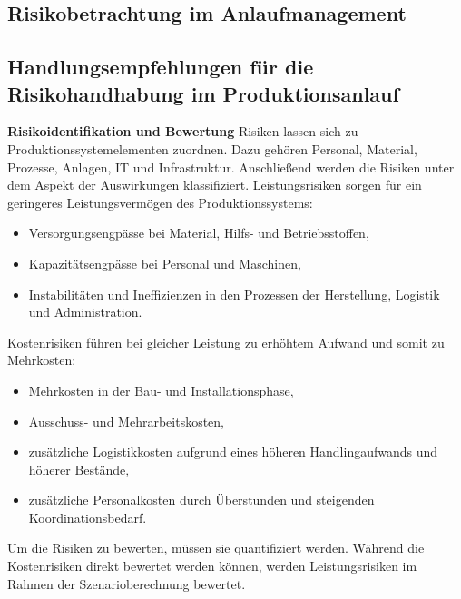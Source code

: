 \subsection{Risikobetrachtung im Anlaufmanagement}

\subsection{Handlungsempfehlungen für die Risikohandhabung im Produktionsanlauf}

\textbf{Risikoidentifikation und Bewertung}
Risiken lassen sich zu Produktionssystemelementen zuordnen. Dazu gehören Personal, Material, Prozesse, Anlagen, IT und Infrastruktur. Anschließend werden die Risiken unter dem Aspekt der Auswirkungen klassifiziert. Leistungsrisiken sorgen für ein geringeres Leistungsvermögen des Produktionssystems:
\begin{itemize}
 \item Versorgungsengpässe bei Material,
Hilfs- und Betriebsstoffen,
\item Kapazitätsengpässe bei Personal und
Maschinen,
\item Instabilitäten und Ineffizienzen in
den Prozessen der Herstellung,
Logistik und Administration.
\end{itemize}
Kostenrisiken führen bei gleicher Leistung zu erhöhtem Aufwand und somit zu Mehrkosten: %
\begin{itemize}
 \item Mehrkosten in der Bau- und Installationsphase,
\item Ausschuss- und Mehrarbeitskosten,
\item zusätzliche Logistikkosten aufgrund
eines höheren Handlingaufwands
und höherer Bestände,
\item zusätzliche Personalkosten durch
Überstunden und steigenden Koordinationsbedarf.
\end{itemize}

Um die Risiken zu bewerten, müssen sie quantifiziert werden. Während die Kostenrisiken direkt bewertet werden können, werden Leistungsrisiken im Rahmen der Szenarioberechnung bewertet. 

